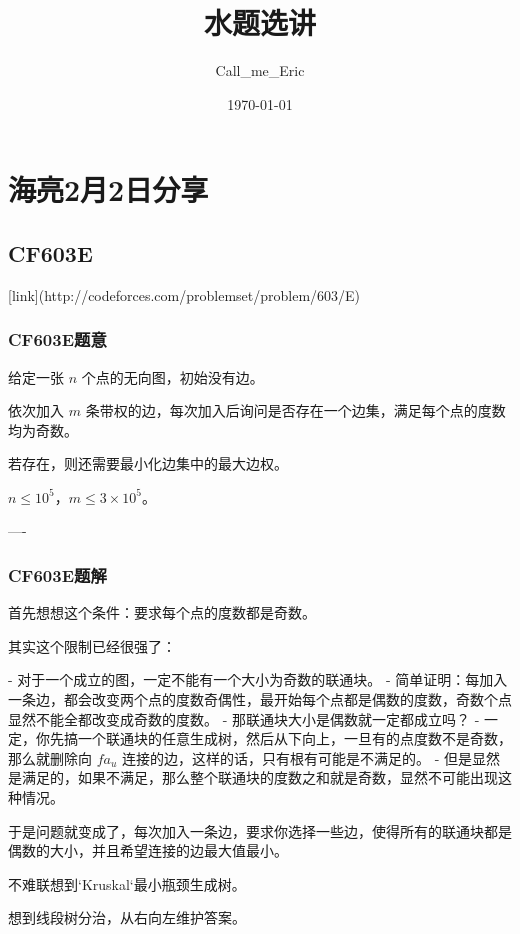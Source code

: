 \documentclass[a4paper,12pt]{article}
\begin{document}
\title{水题选讲}
\author{Call_me_Eric}
\date{\today}
\maketitle

\section*{海亮2月2日分享}

\subsection*{CF603E}

[link](http://codeforces.com/problemset/problem/603/E)

\subsubsection*{CF603E题意}

给定一张 $n$ 个点的无向图，初始没有边。

依次加入 $m$ 条带权的边，每次加入后询问是否存在一个边集，满足每个点的度数均为奇数。

若存在，则还需要最小化边集中的最大边权。

$n \le 10^5$，$m \le 3 \times 10^5$。

----

\subsubsection*{CF603E题解}

首先想想这个条件：要求每个点的度数都是奇数。

其实这个限制已经很强了：

- 对于一个成立的图，一定不能有一个大小为奇数的联通块。
- 简单证明：每加入一条边，都会改变两个点的度数奇偶性，最开始每个点都是偶数的度数，奇数个点显然不能全都改变成奇数的度数。
- 那联通块大小是偶数就一定都成立吗？
- 一定，你先搞一个联通块的任意生成树，然后从下向上，一旦有的点度数不是奇数，那么就删除向 $fa_u$ 连接的边，这样的话，只有根有可能是不满足的。
- 但是显然是满足的，如果不满足，那么整个联通块的度数之和就是奇数，显然不可能出现这种情况。

于是问题就变成了，每次加入一条边，要求你选择一些边，使得所有的联通块都是偶数的大小，并且希望连接的边最大值最小。

不难联想到`Kruskal`最小瓶颈生成树。

想到线段树分治，从右向左维护答案。
\end{document}
